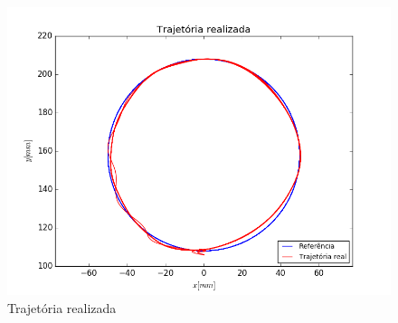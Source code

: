 \documentclass[]{politex}
\begin{document}
\begin{figure}[H]
	\centering
	\includegraphics[scale=0.39]{../../../Experimental/Aquisicoes/PIDt_circulo/xy.png}  
	\caption{Trajetória realizada}
	\label{fig:PIDq_circulo_xy}
\end{figure}
\end{document}
